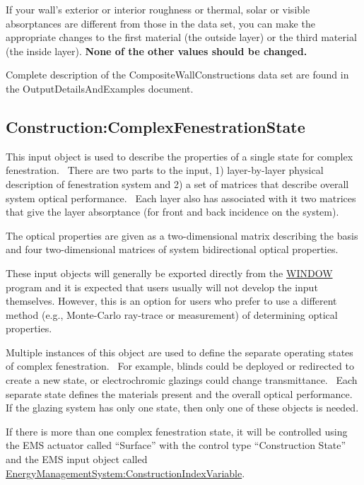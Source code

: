 If your wall's exterior or interior roughness or thermal, solar or visible absorptances are different from those in the data set, you can make the appropriate changes to the first material (the outside layer) or the third material (the inside layer). \textbf{None of the other values should be changed.}

\begin{callout}
Complete description of the CompositeWallConstructions data set are found in the OutputDetailsAndExamples document.
\end{callout}

\subsection{Construction:ComplexFenestrationState}\label{constructioncomplexfenestrationstate}

This input object is used to describe the properties of a single state for complex fenestration.~ There are two parts to the input, 1) layer-by-layer physical description of fenestration system and 2) a set of matrices that describe overall system optical performance.~ Each layer also has associated with it two matrices that give the layer absorptance (for front and back incidence on the system).

The optical properties are given as a two-dimensional matrix describing the basis and four two-dimensional matrices of system bidirectional optical properties.

These input objects will generally be exported directly from the \href{https://windows.lbl.gov/software-tools#window-heading}{WINDOW} program and it is expected that users usually will not develop the input themselves. However, this is an option for users who prefer to use a different method (e.g., Monte-Carlo ray-trace or measurement) of determining optical properties.

Multiple instances of this object are used to define the separate operating states of complex fenestration.~ For example, blinds could be deployed or redirected to create a new state, or electrochromic glazings could change transmittance.~ Each separate state defines the materials present and the overall optical performance.~ If the glazing system has only one state, then only one of these objects is needed.

If there is more than one complex fenestration state, it will be controlled using the EMS actuator called ``Surface'' with the control type ``Construction State'' and the EMS input object called \hyperref[energymanagementsystemconstructionindexvariable]{EnergyManagementSystem:ConstructionIndexVariable}.

